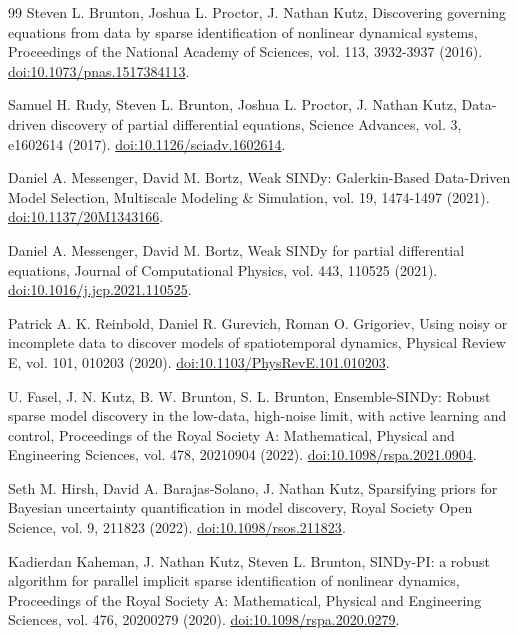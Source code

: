 \begin{thebibliography}{99}
 Steven L. Brunton, Joshua L. Proctor, J. Nathan Kutz, Discovering governing equations from data by sparse identification of nonlinear dynamical systems, Proceedings of the National Academy of Sciences, vol. 113, 3932-3937 (2016). \href{https://doi.org/10.1073/pnas.1517384113}{doi:10.1073/pnas.1517384113}.

 Samuel H. Rudy, Steven L. Brunton, Joshua L. Proctor, J. Nathan Kutz, Data-driven discovery of partial differential equations, Science Advances, vol. 3, e1602614 (2017). \href{https://doi.org/10.1126/sciadv.1602614}{doi:10.1126/sciadv.1602614}.

 Daniel A. Messenger, David M. Bortz, Weak SINDy: Galerkin-Based Data-Driven Model Selection, Multiscale Modeling \& Simulation, vol. 19, 1474-1497 (2021). \href{https://doi.org/10.1137/20M1343166}{doi:10.1137/20M1343166}.

 Daniel A. Messenger, David M. Bortz, Weak SINDy for partial differential equations, Journal of Computational Physics, vol. 443, 110525 (2021). \href{https://doi.org/10.1016/j.jcp.2021.110525}{doi:10.1016/j.jcp.2021.110525}.

 Patrick A. K. Reinbold, Daniel R. Gurevich, Roman O. Grigoriev, Using noisy or incomplete data to discover models of spatiotemporal dynamics, Physical Review E, vol. 101, 010203 (2020). \href{https://doi.org/10.1103/PhysRevE.101.010203}{doi:10.1103/PhysRevE.101.010203}.

 U. Fasel, J. N. Kutz, B. W. Brunton, S. L. Brunton, Ensemble-SINDy: Robust sparse model discovery in the low-data, high-noise limit, with active learning and control, Proceedings of the Royal Society A: Mathematical, Physical and Engineering Sciences, vol. 478, 20210904 (2022). \href{https://doi.org/10.1098/rspa.2021.0904}{doi:10.1098/rspa.2021.0904}.

 Seth M. Hirsh, David A. Barajas-Solano, J. Nathan Kutz, Sparsifying priors for Bayesian uncertainty quantification in model discovery, Royal Society Open Science, vol. 9, 211823 (2022). \href{https://doi.org/10.1098/rsos.211823}{doi:10.1098/rsos.211823}.

 Kadierdan Kaheman, J. Nathan Kutz, Steven L. Brunton, SINDy-PI: a robust algorithm for parallel implicit sparse identification of nonlinear dynamics, Proceedings of the Royal Society A: Mathematical, Physical and Engineering Sciences, vol. 476, 20200279 (2020). \href{https://doi.org/10.1098/rspa.2020.0279}{doi:10.1098/rspa.2020.0279}.


\end{thebibliography}
